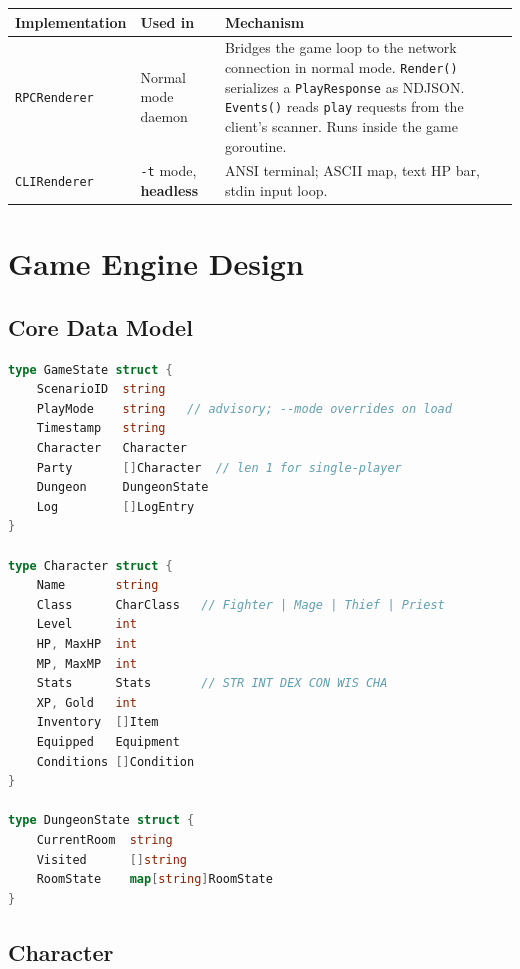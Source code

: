 \documentclass[a4paper,10pt]{article}
\newcommand{\cmd}[1]{\texttt{#1}}
\newcommand{\mode}[1]{\textbf{#1}}
\begin{document}
\begin{center}
\small
\begin{tabular}{lp{2.8cm}p{7cm}}
\toprule
\textbf{Implementation} & \textbf{Used in} & \textbf{Mechanism} \\
\midrule
\texttt{RPCRenderer}
  & Normal mode daemon
  & Bridges the game loop to the network connection in normal mode.
    \texttt{Render()} serializes a \texttt{Play\-Response} as NDJSON.
    \texttt{Events()} reads \texttt{play} requests from the client's
    scanner.  Runs inside the game goroutine. \\
\texttt{CLIRenderer}
  & \cmd{-t} mode, \mode{headless}
  & ANSI terminal; ASCII map, text HP bar, stdin input loop. \\
\bottomrule
\end{tabular}
\end{center}

\section{Game Engine Design}
\label{sec:engine}

\subsection{Core Data Model}

\begin{lstlisting}[language=Go]
type GameState struct {
    ScenarioID  string
    PlayMode    string   // advisory; --mode overrides on load
    Timestamp   string
    Character   Character
    Party       []Character  // len 1 for single-player
    Dungeon     DungeonState
    Log         []LogEntry
}

type Character struct {
    Name       string
    Class      CharClass   // Fighter | Mage | Thief | Priest
    Level      int
    HP, MaxHP  int
    MP, MaxMP  int
    Stats      Stats       // STR INT DEX CON WIS CHA
    XP, Gold   int
    Inventory  []Item
    Equipped   Equipment
    Conditions []Condition
}

type DungeonState struct {
    CurrentRoom  string
    Visited      []string
    RoomState    map[string]RoomState
}
\end{lstlisting}

\subsection{Character}
\end{document}
